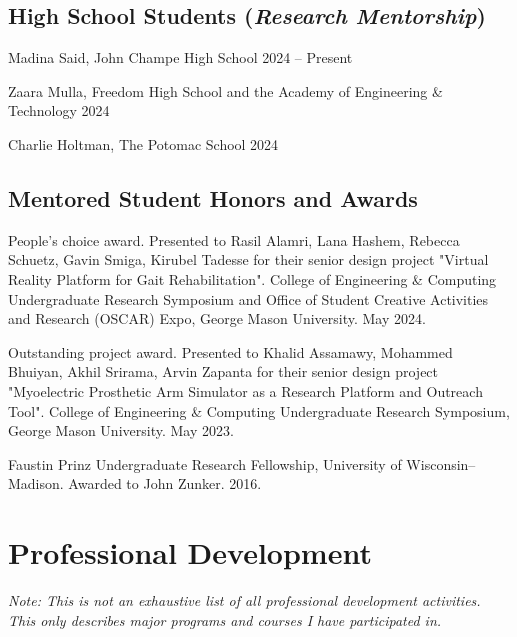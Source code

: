 \documentclass[letterpaper, 10pt]{article}
\begin{document}
\subsection{\textbf{High School Students} (\textit{Research Mentorship})}
\begin{compacthang}
     \item Madina Said, John Champe High School \hfill 2024 -- Present
     \item Zaara Mulla, Freedom High School and the Academy of Engineering \& Technology \hfill 2024
     \item Charlie Holtman, The Potomac School \hfill 2024
\end{compacthang}


\subsection{\textbf{Mentored Student Honors and Awards}}
\begin{compactitem}
     \item People's choice award. Presented to Rasil Alamri, Lana Hashem, Rebecca Schuetz, Gavin Smiga, Kirubel Tadesse for their senior design project "Virtual Reality Platform for Gait Rehabilitation". College of Engineering \& Computing Undergraduate Research Symposium and Office of Student Creative Activities and Research (OSCAR) Expo, George Mason University. May 2024.
	\item Outstanding project award. Presented to Khalid Assamawy, Mohammed Bhuiyan, Akhil Srirama, Arvin Zapanta for their senior design project "Myoelectric Prosthetic Arm Simulator as a Research Platform and Outreach Tool". College of Engineering \& Computing Undergraduate Research Symposium, George Mason University. May 2023. %
	\item Faustin Prinz Undergraduate Research Fellowship, University of Wisconsin--Madison. Awarded to John Zunker. 2016.
\end{compactitem}

\section{Professional Development}
\begin{itemize}
\end{itemize}
\end{document}
